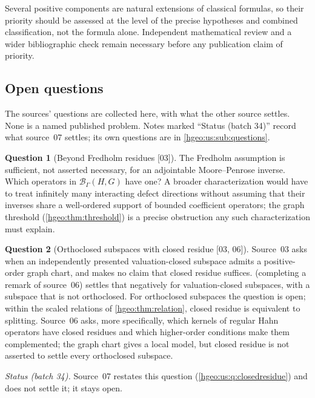 \documentclass[11pt,letterpaper]{article}
\numberwithin{equation}{section}
\theoremstyle{definition}
\newtheorem{question}[question]{Question}
\theoremstyle{remark}
\newcommand{\BB}[2]{\mathscr B_\Gamma(#1,#2)}
\newcommand{\src}[1]{\textup{\textsf{\small[#1]}}}
\begin{document}
Several positive components are natural extensions of classical formulas, so
their priority should be assessed at the level of the precise hypotheses and
combined classification, not the formula alone. Independent mathematical
review and a wider bibliographic check remain necessary before any
publication claim of priority.

\subsection{Open questions}\label{hgeo:sub:questions}
The sources' questions are collected here, with what the other source
settles. None is a named published problem. Notes marked ``Status (batch 34)''
record what source~07 settles; its own questions are in
\cref{hgeo:us:sub:questions}.

\begin{question}[Beyond Fredholm residues \src{03}]\label{hgeo:q:mp}
The Fredholm assumption is sufficient, not asserted necessary, for an
adjointable Moore--Penrose inverse. Which operators in $\BB{H}{G}$ have one?
A broader characterization would have to treat infinitely many interacting
defect directions without assuming that their inverses share a well-ordered
support of bounded coefficient operators; the graph threshold
(\cref{hgeo:thm:threshold}) is a precise obstruction any such
characterization must explain.
\end{question}

\begin{question}[Orthoclosed subspaces with closed residue \src{03, 06}]
\label{hgeo:q:orthoclosed}
Source~03 asks when an independently presented valuation-closed subspace
admits a positive-order graph chart, and makes no claim that closed residue
suffices.  (completing a remark of source~06)
settles that negatively for valuation-closed subspaces, with a subspace that
is not orthoclosed. For orthoclosed subspaces the question is open; within
the scaled relations of \cref{hgeo:thm:relation}, closed residue is
equivalent to splitting. Source~06 asks, more specifically, which kernels of
regular Hahn operators have closed residues and which higher-order conditions
make them complemented; the graph chart gives a local model, but closed
residue is not asserted to settle every orthoclosed subspace.
\end{question}

\noindent\emph{Status (batch 34).} Source~07 restates this question
(\cref{hgeo:us:q:closedresidue}) and does not settle it; it stays open.
\end{document}
